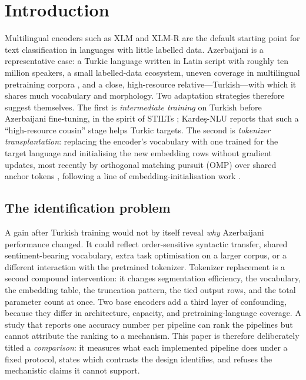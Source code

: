 \section{Introduction}
\label{sec:intro}

Multilingual encoders such as XLM \cite{lample2019xlm} and XLM-R \cite{conneau2020xlmr} are the default starting point for text classification in languages with little labelled data. Azerbaijani is a representative case: a Turkic language written in Latin script with roughly ten million speakers, a small labelled-data ecosystem, uneven coverage in multilingual pretraining corpora \cite{wu2020alllanguages}, and a close, high-resource relative---Turkish---with which it shares much vocabulary and morphology. Two adaptation strategies therefore suggest themselves. The first is \emph{intermediate training} on Turkish before Azerbaijani fine-tuning, in the spirit of STILTs \cite{phang2018stilts,pruksachatkun2020intermediate}; Kardeş-NLU \cite{senel2024kardes} reports that such a ``high-resource cousin'' stage helps Turkic targets. The second is \emph{tokenizer transplantation}: replacing the encoder's vocabulary with one trained for the target language and initialising the new embedding rows without gradient updates, most recently by orthogonal matching pursuit (OMP) over shared anchor tokens \cite{goddard2025omp}, following a line of embedding-initialisation work \cite{minixhofer2022wechsel,dobler2023focus,gee2022fvt,minixhofer2024zett}.

\subsection{The identification problem}
A gain after Turkish training would not by itself reveal \emph{why} Azerbaijani performance changed. It could reflect order-sensitive syntactic transfer, shared sentiment-bearing vocabulary, extra task optimisation on a larger corpus, or a different interaction with the pretrained tokenizer. Tokenizer replacement is a second compound intervention: it changes segmentation efficiency, the vocabulary, the embedding table, the truncation pattern, the tied output rows, and the total parameter count at once. Two base encoders add a third layer of confounding, because they differ in architecture, capacity, and pretraining-language coverage. A study that reports one accuracy number per pipeline can rank the pipelines but cannot attribute the ranking to a mechanism. This paper is therefore deliberately titled a \emph{comparison}: it measures what each implemented pipeline does under a fixed protocol, states which contrasts the design identifies, and refuses the mechanistic claims it cannot support.

